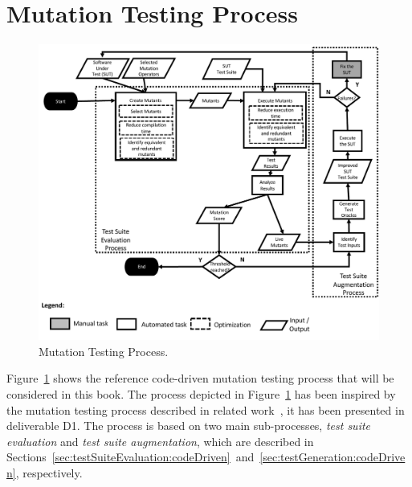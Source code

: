 
\section{Mutation Testing Process}
\label{sec:process}

	\begin{figure}
	\centering
		\includegraphics[width=\textwidth]{images/process}
		\caption{Mutation Testing Process.}
		\label{fig:code:process}
	\end{figure}

Figure~\ref{fig:code:process} shows the reference code-driven mutation testing process that will be considered in this book. The process depicted in Figure~\ref{fig:code:process} has been inspired by the mutation testing process described in related work~\cite{offutt2001mutation,papadakis2019mutation}, it has been presented in deliverable D1. The process is based on two main sub-processes, \emph{test suite evaluation} and \emph{test suite augmentation}, which are described in Sections~\ref{sec:testSuiteEvaluation:codeDriven}~and~\ref{sec:testGeneration:codeDriven}, respectively.


\endinput





